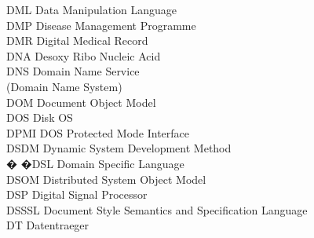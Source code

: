 \begin{tabbing}
    \>DML \>\>Data Manipulation Language\\

    \>DMP \>\>Disease Management Programme\\

    \>DMR \>\>Digital Medical Record\\

    \>DNA \>\>Desoxy Ribo Nucleic Acid\\



    \>DNS \>\>Domain Name Service\\
        \>\>\>(Domain Name System)\\

    \>DOM \>\>Document Object Model\\

    \>DOS \>\>Disk OS\\

    \>DPMI \>\>DOS Protected Mode Interface\\


    \>DSDM \>\>Dynamic System Development Method\\




 � �\>DSL \>\>Domain Specific Language\\

    \>DSOM \>\>Distributed System Object Model\\

    \>DSP \>\>Digital Signal Processor\\

    \>DSSSL \>\>Document Style Semantics and Specification Language\\


    \>DT \>\>Datentraeger\\


\end{tabbing}
